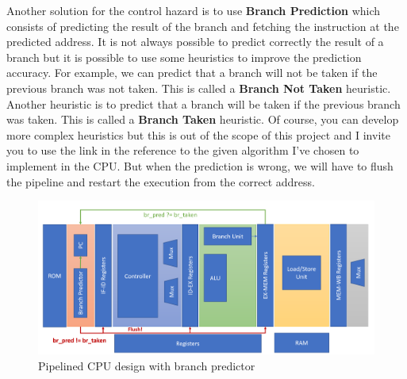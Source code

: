 Another solution for the control hazard is to use \textbf{Branch Prediction} which consists of predicting the result of the branch and fetching the instruction at the predicted address.
It is not always possible to predict correctly the result of a branch but it is possible to use some heuristics to improve the prediction accuracy. For example, we can predict that a branch will not be taken
if the previous branch was not taken. This is called a \textbf{Branch Not Taken} heuristic. Another heuristic is to predict that a branch will be taken if the previous branch was taken. This is called a \textbf{Branch Taken} heuristic.
Of course, you can develop more complex heuristics but this is out of the scope of this project and I invite you to use the link in the reference to the given algorithm I've chosen 
to implement in the CPU\@. But when the prediction is wrong, we will have to flush the pipeline and restart the execution from the correct address. \\

\begin{figure}[H]
    \centering
    \includegraphics[width=1\textwidth]{design/pipelined/images/pipelined_design_predictor.png}
    \caption{Pipelined CPU design with branch predictor}
    \label{fig:pipelined_cpu_design_predictor}
\end{figure}



